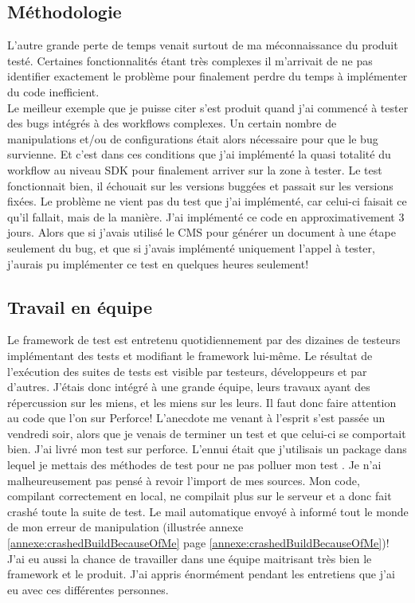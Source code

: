 \subsection{Méthodologie}
L'autre grande perte de temps venait surtout de ma méconnaissance du produit testé. Certaines fonctionnalités étant très complexes il m'arrivait de ne pas identifier exactement le problème pour finalement perdre du temps à implémenter du code inefficient.\\
Le meilleur exemple que je puisse citer s'est produit quand j'ai commencé à tester des bugs intégrés à des workflows complexes. Un certain nombre de manipulations et/ou de configurations était alors nécessaire pour que le bug survienne. Et c'est dans ces conditions que j'ai implémenté la quasi totalité du workflow au niveau SDK pour finalement arriver sur la zone à tester. Le test fonctionnait bien, il échouait sur les versions buggées et passait sur les versions fixées. Le problème ne vient pas du test que j'ai implémenté, car celui-ci faisait ce qu'il fallait, mais de la manière. J'ai implémenté ce code en approximativement 3 jours. Alors que si j'avais utilisé le CMS pour générer un document à une étape seulement du bug, et que si j'avais implémenté uniquement l'appel à tester, j'aurais pu implémenter ce test en quelques heures seulement!

\subsection{Travail en équipe}
Le framework de test est entretenu quotidiennement par des dizaines de testeurs implémentant des tests et modifiant le framework lui-même. Le résultat de l'exécution des suites de tests est visible par testeurs, développeurs et par d'autres. J'étais donc intégré à une grande équipe, leurs travaux ayant des répercussion sur les miens, et les miens sur les leurs. Il faut donc faire attention au code que l'on  sur Perforce! L'anecdote me venant à l'esprit s'est passée un vendredi soir, alors que je venais de terminer un test et que celui-ci se comportait bien. J'ai livré mon test sur perforce. L'ennui était que j'utilisais un package dans lequel je mettais des méthodes de test pour ne pas polluer mon test . Je n'ai malheureusement pas pensé à revoir l'import de mes sources. Mon code, compilant correctement en local, ne compilait plus sur le serveur et a donc fait crashé toute la suite de test. Le mail automatique envoyé à informé tout le monde de mon erreur de manipulation (illustrée annexe \ref{annexe:crashedBuildBecauseOfMe} page \ref{annexe:crashedBuildBecauseOfMe})!\\

J'ai eu aussi la chance de travailler dans une équipe maitrisant très bien le framework et le produit. J'ai appris énormément pendant les entretiens que j'ai eu avec ces différentes personnes.

